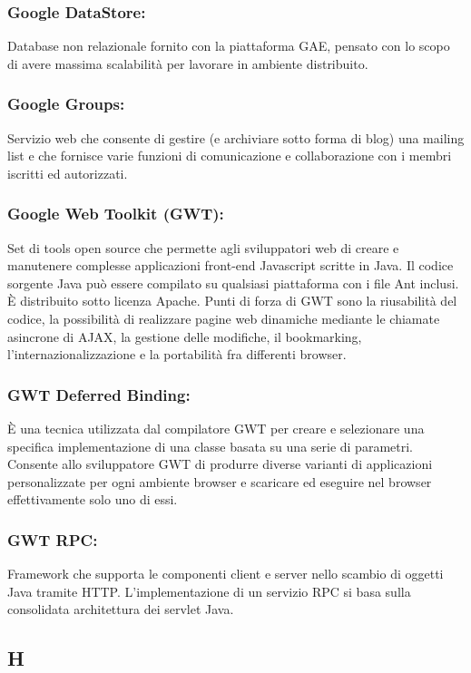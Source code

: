 \subsubsection*{Google DataStore:} Database non relazionale fornito con la
piattaforma GAE, pensato con lo scopo di avere massima scalabilit\`a per
lavorare in ambiente distribuito.

\subsubsection*{Google Groups:} Servizio web che consente di gestire (e
archiviare sotto forma di blog) una mailing list e che fornisce varie funzioni
di comunicazione e collaborazione con i membri iscritti ed autorizzati.

\subsubsection*{Google Web Toolkit (GWT):} Set di tools open source che
permette agli sviluppatori web di creare e manutenere complesse applicazioni front-end
Javascript scritte in Java. Il codice sorgente Java pu\`o essere compilato su
qualsiasi piattaforma con i file Ant inclusi. \`E distribuito sotto licenza
Apache. Punti di forza di GWT sono la riusabilit\`a del codice, la possibilit\`a di
realizzare pagine web dinamiche mediante le chiamate asincrone di AJAX, la
gestione delle modifiche, il bookmarking, l'internazionalizzazione e la
portabilit\`a fra differenti browser.

\subsubsection*{GWT Deferred Binding:}
\`E una tecnica utilizzata dal compilatore GWT per creare e selezionare una
specifica implementazione di una classe basata su una serie di parametri.
Consente allo sviluppatore GWT di produrre diverse varianti di
applicazioni personalizzate per ogni ambiente browser e scaricare ed eseguire
nel browser effettivamente solo uno di essi.

\subsubsection*{GWT RPC:}
Framework che supporta le componenti client e server nello scambio di
oggetti Java tramite HTTP. L'implementazione di un servizio RPC si basa sulla
consolidata architettura dei servlet Java.

\subsection*{\huge{H}}
